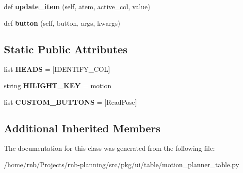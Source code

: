 \begin{DoxyCompactItemize}
\mbox{\label{classrnb-planning_1_1src_1_1pkg_1_1ui_1_1table_1_1motion__planner__table_1_1_motion_plan_table_a7d5379ae92d2dd789b8dfc779e76d541}} 
def {\bfseries update\+\_\+item} (self, atem, active\+\_\+col, value)
\item 
\mbox{\label{classrnb-planning_1_1src_1_1pkg_1_1ui_1_1table_1_1motion__planner__table_1_1_motion_plan_table_a2d601d9c1ed0608f2e86edc31c39fa40}} 
def {\bfseries button} (self, button, args, kwargs)
\end{DoxyCompactItemize}
\subsection*{Static Public Attributes}
\begin{DoxyCompactItemize}
\item 
\mbox{\label{classrnb-planning_1_1src_1_1pkg_1_1ui_1_1table_1_1motion__planner__table_1_1_motion_plan_table_a852c0b1b02ee25ca2a9bd71a53ea12fd}} 
list {\bfseries H\+E\+A\+DS} = \mbox{[}I\+D\+E\+N\+T\+I\+F\+Y\+\_\+\+C\+OL\mbox{]}
\item 
\mbox{\label{classrnb-planning_1_1src_1_1pkg_1_1ui_1_1table_1_1motion__planner__table_1_1_motion_plan_table_a13a96a5a0d447fd444a593332310ac32}} 
string {\bfseries H\+I\+L\+I\+G\+H\+T\+\_\+\+K\+EY} = \textquotesingle{}motion\textquotesingle{}
\item 
\mbox{\label{classrnb-planning_1_1src_1_1pkg_1_1ui_1_1table_1_1motion__planner__table_1_1_motion_plan_table_a24dda79bbefb917ecbf173ae43736c10}} 
list {\bfseries C\+U\+S\+T\+O\+M\+\_\+\+B\+U\+T\+T\+O\+NS} = \mbox{[}\textquotesingle{}Read\+Pose\textquotesingle{}\mbox{]}
\end{DoxyCompactItemize}
\subsection*{Additional Inherited Members}


The documentation for this class was generated from the following file\+:\begin{DoxyCompactItemize}
\item 
/home/rnb/\+Projects/rnb-\/planning/src/pkg/ui/table/motion\+\_\+planner\+\_\+table.\+py\end{DoxyCompactItemize}
